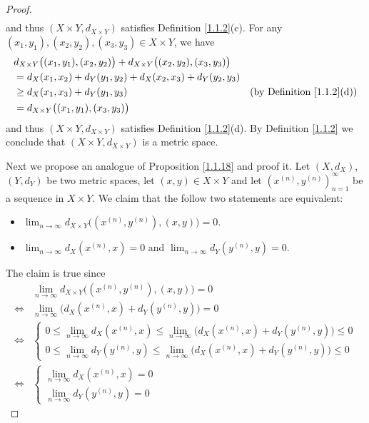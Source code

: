 \begin{proof}
\begin{align*}
    \end{align*}
    and thus \((X \times Y, d_{X \times Y})\) satisfies Definition \ref{1.1.2}(c).
    For any \((x_1, y_1), (x_2, y_2), (x_3, y_3) \in X \times Y\), we have
    \begin{align*}
         & d_{X \times Y}\big((x_1, y_1), (x_2, y_2)\big) + d_{X \times Y}\big((x_2, y_2), (x_3, y_3)\big)                                         \\
         & = d_X(x_1, x_2) + d_Y(y_1, y_2) + d_X(x_2, x_3) + d_Y(y_2, y_3)                                                                         \\
         & \geq d_X(x_1, x_3) + d_Y(y_1, y_3)                                                              & \text{(by Definition \ref{1.1.2}(d))} \\
         & = d_{X \times Y}\big((x_1, y_1), (x_3, y_3)\big)
    \end{align*}
    and thus \((X \times Y, d_{X \times Y})\) satisfies Definition \ref{1.1.2}(d).
    By Definition \ref{1.1.2} we conclude that \((X \times Y, d_{X \times Y})\) is a metric space.

    Next we propose an analogue of Proposition \ref{1.1.18} and proof it.
    Let \((X, d_X)\), \((Y, d_Y)\) be two metric spaces, let \((x, y) \in X \times Y\) and let \((x^{(n)}, y^{(n)})_{n = 1}^\infty\) be a sequence in \(X \times Y\).
    We claim that the follow two statements are equivalent:
    \begin{itemize}
        \item \(\lim_{n \to \infty} d_{X \times Y}\big((x^{(n)}, y^{(n)}), (x, y)\big) = 0\).
        \item \(\lim_{n \to \infty} d_X(x^{(n)}, x) = 0\) and \(\lim_{n \to \infty} d_Y(y^{(n)}, y) = 0\).
    \end{itemize}
    The claim is true since
    \begin{align*}
             & \lim_{n \to \infty} d_{X \times Y}\big((x^{(n)}, y^{(n)}), (x, y)\big) = 0                                             \\
        \iff & \lim_{n \to \infty} \big(d_X(x^{(n)}, x) + d_Y(y^{(n)}, y)\big) = 0                                                    \\
        \iff & \begin{cases}
                   0 \leq \lim_{n \to \infty} d_X(x^{(n)}, x) \leq \lim_{n \to \infty} \big(d_X(x^{(n)}, x) + d_Y(y^{(n)}, y)\big) \leq 0 \\
                   0 \leq \lim_{n \to \infty} d_Y(y^{(n)}, y) \leq \lim_{n \to \infty} \big(d_X(x^{(n)}, x) + d_Y(y^{(n)}, y)\big) \leq 0
               \end{cases} \\
        \iff & \begin{cases}
                   \lim_{n \to \infty} d_X(x^{(n)}, x) = 0 \\
                   \lim_{n \to \infty} d_Y(y^{(n)}, y) = 0
               \end{cases}
    \end{align*}


\end{proof}
